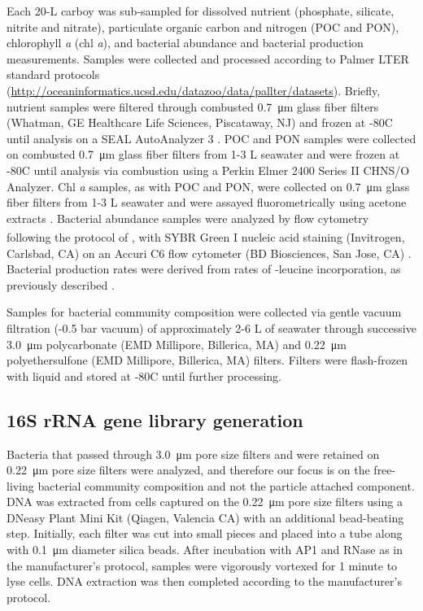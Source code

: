 Each 20-L carboy was sub-sampled for dissolved nutrient (phosphate, silicate, nitrite and nitrate), particulate organic carbon and nitrogen (POC and PON), chlorophyll \textit{a} (chl \textit{a}), and bacterial abundance and bacterial production measurements. Samples were collected and processed according to Palmer LTER standard protocols (\url{http://oceaninformatics.ucsd.edu/datazoo/data/pallter/datasets}). Briefly, nutrient samples were filtered through combusted \SI{0.7}{\micro\meter} glass fiber filters (Whatman, GE Healthcare Life Sciences, Piscataway, NJ) and frozen at -80\textdegree C until analysis on a SEAL AutoAnalyzer 3 \citep{ducklow_doi_2016a}. POC and PON samples were collected on combusted \SI{0.7}{\micro\meter} glass fiber filters from 1-3 L seawater and were frozen at -80\textdegree C until analysis via combustion using a Perkin Elmer 2400 Series II CHNS/O Analyzer. Chl \textit{a} samples, as with POC and PON, were collected on \SI{0.7}{\micro\meter} glass fiber filters from 1-3 L seawater and were assayed fluorometrically using acetone extracts \citep{schofield_doi_2016}. Bacterial abundance samples were analyzed by flow cytometry following the protocol of \citet{Gasol2000-mn}, with SYBR\textsuperscript{\textregistered} Green I nucleic acid staining (Invitrogen, Carlsbad, CA) on an Accuri C6 flow cytometer (BD Biosciences, San Jose, CA) \citep{ducklow_doi_2016b}. Bacterial production rates were derived from rates of -leucine incorporation, as previously described \citep{dsvse12,ducklow_doi_2016b}. 

Samples for bacterial community composition were collected via gentle vacuum filtration (-0.5 bar vacuum) of approximately 2-6 L of seawater through successive \SI{3.0}{\micro\meter} polycarbonate (EMD Millipore, Billerica, MA) and \SI{0.22}{\micro\meter} polyethersulfone (EMD Millipore, Billerica, MA) filters. Filters were flash-frozen with liquid  and stored at -80\textdegree C until further processing. 

\subsection{16S rRNA gene library generation }\label{s-rrna-gene-library-generation} 

Bacteria that passed through \SI{3.0}{\micro\meter} pore size filters and were retained on \SI{0.22}{\micro\meter} pore size filters were analyzed, and therefore our focus is on the free-living bacterial community composition and not the particle attached component. DNA was extracted from cells captured on the \SI{0.22}{\micro\meter} pore size filters using a DNeasy Plant Mini Kit (Qiagen, Valencia CA) with an additional bead-beating step. Initially, each filter was cut into small pieces and placed into a tube along with \SI{0.1}{\micro\meter} diameter silica beads. After incubation with AP1 and RNase as in the manufacturer's protocol, samples were vigorously vortexed for 1 minute to lyse cells. DNA extraction was then completed according to the manufacturer's protocol. 

